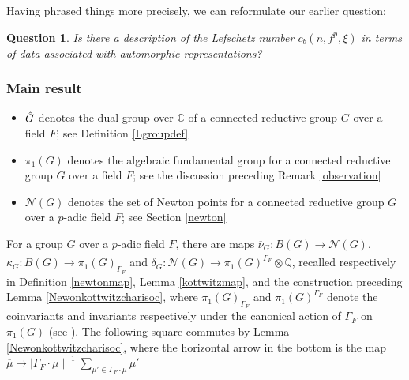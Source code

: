\documentclass[11pt,a4paper]{article}
\theoremstyle{definition}
\theoremstyle{plain}
\theoremstyle{remark}
\theoremstyle{plain}
\newtheorem*{Q}{Question}
\begin{document}
Having phrased things more precisely, we can reformulate our earlier question:

\begin{Q}\label{lknumberquestion}
    Is there a description of the Lefschetz number $c_b(n,f^p,\xi)$ in terms of data associated with automorphic representations?
\end{Q}

\subsubsection{Main result}
\begin{itemize}
    \item $\Hat{G}$ denotes the dual group over $\mathbb{C}$ of a connected reductive group $G$ over a field $F$; see Definition \ref{Lgroupdef}
    \item $\pi_1(G)$ denotes the algebraic fundamental group for a connected reductive group $G$ over a field $F$; see the discussion preceding Remark \ref{observation}
    \item $\mathcal{N}(G)$ denotes the set of Newton points for a connected reductive group $G$ over a $p$-adic field $F$; see Section \ref{newton}
\end{itemize}

For a group $G$ over a $p$-adic field $F$, there are maps $\overline{\nu}_G: B(G) \xrightarrow[]{} \mathcal{N}(G)$, $\kappa_G: B(G) \xrightarrow[]{} \pi_1(G)_{\Gamma_F}$ and $\delta_G: \mathcal{N}(G) \xrightarrow[]{} \pi_1(G)^{\Gamma_F} \otimes \mathbb{Q}$, recalled respectively in Definition \ref{newtonmap}, Lemma \ref{kottwitzmap}, and the construction preceding Lemma \ref{Newonkottwitzcharisoc}, where $\pi_1(G)_{\Gamma_F}$ and $\pi_1(G)^{\Gamma_F}$ denote the coinvariants and invariants respectively under the canonical action of $\Gamma_F$ on $\pi_1(G)$ (see \cite{MR1411570}). The following square commutes by Lemma \ref{Newonkottwitzcharisoc}, where the horizontal arrow in the bottom is the map $\overline{\mu} \mapsto \mid \Gamma_F \cdot \mu \mid ^{-1} \sum_{\mu' \in \Gamma_F \cdot \mu} \mu'$

\begin{center}
\end{center}
\end{document}
